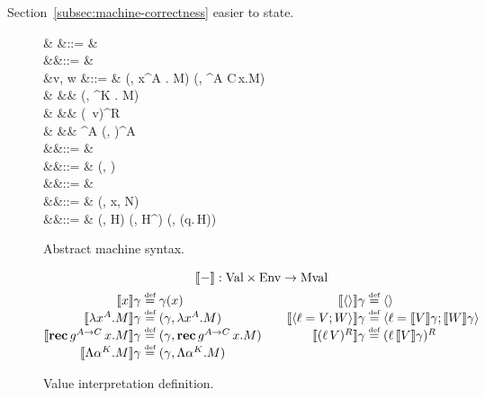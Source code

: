 \documentclass[12pt,phd,lfcs,twoside,openright,logo,leftchapter,normalheadings]{infthesis}
\theoremstyle{plain}
\theoremstyle{definition}
\begin{document}
Section~\ref{subsec:machine-correctness} easier to state.
%
%
\begin{figure}[t]
\flushleft
\begin{syntax}
           & \conf \in \MConfCat &::= &  \\
       &\env \in \MEnvCat  &::= & \emptyset \mid \env[x \mapsto v] \\
                   &v, w \in \MValCat  &::= & (\env, \lambda x^A . M) \mid (\env, \Rec^{A \to C}\,x.M)\\
                                &       &\mid& (\env, \Lambda \alpha^K . M) \\
                                &       &\mid& \Record{} \mid {} \mid (\ell\, v)^R \\
                                &       &\mid& \shk^A \mid (\shk, \slk)^A \medskip\\
            &\shk \in \MGContCat &::= & \nil \mid \shf \cons \shk \\
      &\shf \in \MGFrameCat  &::= & (\slk, \chi) \\
       &\slk \in \MPContCat  &::= & \nil \mid \slf \cons \slk \\
 &\slf \in \MPFrameCat &::= & (\env, x, N) \\
         &\chi \in \MHCloCat  &::= & (\env, H) \mid (\env, H^\dagger) \mid (\env, (q.\,H)) \medskip \\
\end{syntax}

\caption{Abstract machine syntax.}
\label{fig:abstract-machine-syntax-gencont}
\end{figure}
%
\begin{figure}
\[
\bl
\multicolumn{1}{c}{\val{-} : \ValCat \times \MEnvCat \to \MValCat}\\[1ex]
\ba[t]{@{}r@{~}c@{~}l@{}}
\val{x}{\env}                    &\defas& \env(x) \\
\val{\lambda x^A.M}{\env}        &\defas& (\env, \lambda x^A.M) \\
\val{\Rec\,g^{A \to C}\,x.M}{\env} &\defas& (\env, \Rec\,g^{A \to C}\,x.M) \\
\val{\Lambda \alpha^K.M}{\env}   &\defas& (\env, \Lambda \alpha^K.M) \\
\ea
\qquad
\ba[t]{@{}r@{~}c@{~}l@{}}
\val{\Record{}}{\env}            &\defas& \Record{} \\
\val{\Record{\ell = V; W}}{\env} &\defas& \Record{\ell = \val{V}{\env}; \val{W}{\env}} \\
\val{(\ell\, V)^R}{\env}         &\defas& (\ell\, \val{V}{\env})^R \\
\ea
\el
\]
  \caption{Value interpretation definition.}
  \label{fig:abstract-machine-val-interp}
\end{figure}
%
\end{document}
